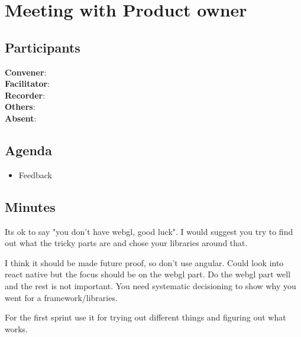 \section*{Meeting with Product owner}

\subsection*{Participants}
\textbf{Convener}: \productowner{}\\
\textbf{Facilitator}: \facilitator{}  \\
\textbf{Recorder}: \scrummaster{}  \\
\textbf{Others}: \groupleader{} \\
\textbf{Absent}: 

\subsection*{Agenda}
\begin{itemize}
    \item Feedback
\end{itemize}

\subsection*{Minutes}
Its ok to say "you don't have webgl, good luck".
I would suggest you try to find out what the tricky parts are and chose your libraries around that.

I think it should be made future proof, so don't use angular. Could look into react native but the focus should be on the webgl part. Do the webgl part well and the rest is not important. You need systematic decisioning to show why you went for a framework/libraries.

For the first sprint use it for trying out different things and figuring out what works.

\newpage